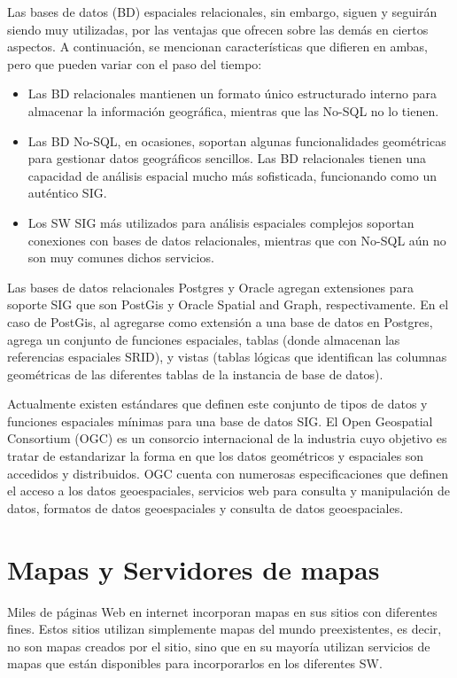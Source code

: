 Las bases de datos (BD) espaciales relacionales, sin embargo, siguen y seguirán siendo muy utilizadas, por las ventajas que ofrecen sobre las demás en ciertos aspectos. A continuación, se mencionan características que difieren en ambas, pero que pueden variar con el paso del tiempo:

\begin{itemize}
    \item Las BD relacionales mantienen un formato único estructurado interno para almacenar la información geográfica, mientras que las No-SQL no lo tienen.
    \item Las BD No-SQL, en ocasiones, soportan algunas funcionalidades geométricas para gestionar datos geográficos sencillos. Las BD relacionales tienen una capacidad de análisis espacial mucho más sofisticada, funcionando como un auténtico SIG.
    \item Los SW SIG más utilizados para análisis espaciales complejos soportan conexiones con bases de datos relacionales, mientras que con No-SQL aún no son muy comunes dichos servicios.
\end{itemize}

Las bases de datos relacionales Postgres y Oracle agregan extensiones para soporte SIG que son PostGis y Oracle Spatial and Graph, respectivamente. En el caso de PostGis, al agregarse como extensión a una base de datos en Postgres, agrega un conjunto de funciones espaciales, tablas (donde almacenan las referencias espaciales SRID), y vistas (tablas lógicas que identifican las columnas geométricas de las diferentes tablas de la instancia de base de datos).

Actualmente existen estándares que definen este conjunto de tipos de datos y funciones espaciales mínimas para una base de datos SIG. El Open Geospatial Consortium (OGC) es un consorcio internacional de la industria cuyo objetivo es tratar de estandarizar la forma en que los datos geométricos y espaciales son accedidos y distribuidos. OGC cuenta con numerosas especificaciones que definen el acceso a los datos geoespaciales, servicios web para consulta y manipulación de datos, formatos de datos geoespaciales y consulta de datos geoespaciales.

\section{Mapas y Servidores de mapas}

Miles de páginas Web en internet incorporan mapas en sus sitios con diferentes fines. Estos sitios utilizan simplemente mapas del mundo preexistentes, es decir, no son mapas creados por el sitio, sino que en su mayoría utilizan servicios de mapas que están disponibles para incorporarlos en los diferentes SW.

